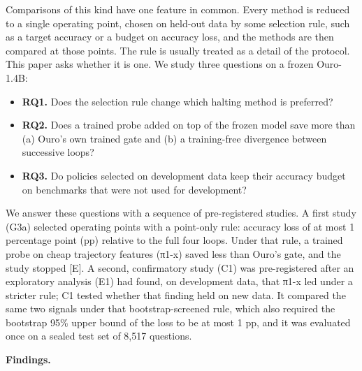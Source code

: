 Comparisons of this kind have one feature in common. Every method is reduced to a single operating point, chosen on held-out data by some
selection rule, such as a target accuracy or a budget on accuracy loss, and the methods are then compared at those points. The rule is usually
treated as a detail of the protocol. This paper asks whether it is one. We study three questions on a frozen Ouro-1.4B:

\begin{itemize}
\tightlist
\item
  \textbf{RQ1.} Does the selection rule change which halting method is preferred?
\item
  \textbf{RQ2.} Does a trained probe added on top of the frozen model save more than (a) Ouro's own trained gate and (b) a training-free
  divergence between successive loops?
\item
  \textbf{RQ3.} Do policies selected on development data keep their accuracy budget on benchmarks that were not used for development?
\end{itemize}

We answer these questions with a sequence of pre-registered studies. A first study (G3a) selected operating points with a point-only rule:
accuracy loss of at most 1 percentage point (pp) relative to the full four loops. Under that rule, a trained probe on cheap trajectory features
(π1-x) saved less than Ouro's gate, and the study stopped {[}E{]}. A second, confirmatory study (C1) was pre-registered after an exploratory analysis (E1) had found, on development data, that π1-x led under a stricter rule; C1 tested whether that finding held on new data.
It compared the same two signals under that bootstrap-screened rule, which also required the bootstrap 95\% upper bound of the loss to be
at most 1 pp, and it was evaluated once on a sealed test set of 8,517 questions.

\textbf{Findings.}


